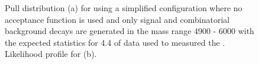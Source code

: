 {\begin{figure}[tbp]
\begin{subfigure}[b]{0.48\textwidth}
   \end{subfigure}
    \caption{Pull distribution (a) for \tmumu using a simplified configuration where no acceptance function is used and only signal and combinatorial background decays are generated in the mass range 4900 - 6000 \mevcc with the expected statistics for 4.4 \fb of data used to measured the \el. Likelihood profile for \tmumu (b).}
    \label{fig:taupulls}
\end{figure}



}
